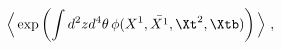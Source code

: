 \begin{equation}
\Big\langle\exp\left(\int
  d^2zd^4\theta\,\phi(X^1,\bar{X^1},\Xt^2, \Xtb )\right)\Big\rangle \ ,
\end{equation}

